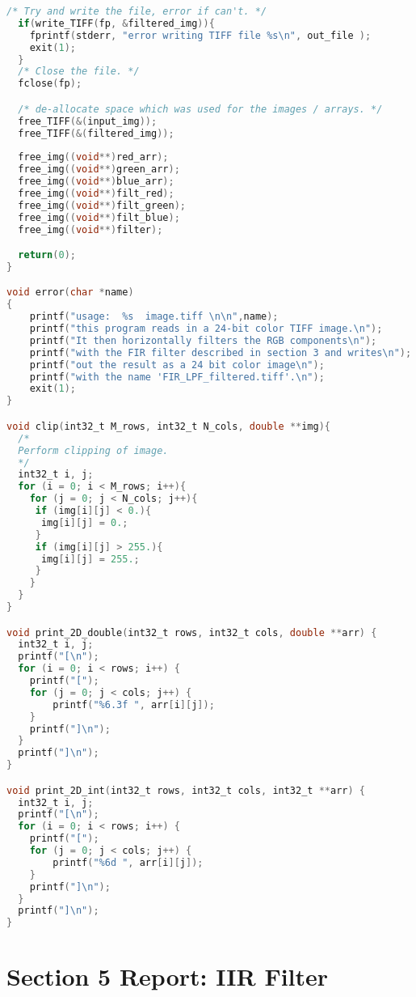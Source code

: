 \documentclass{article}
\begin{document}
\begin{lstlisting}[language=C, caption=filter\_image\_section4.c, label={lst:sec4}]
  /* Try and write the file, error if can't. */
  if(write_TIFF(fp, &filtered_img)){
    fprintf(stderr, "error writing TIFF file %s\n", out_file );
    exit(1);
  }
  /* Close the file. */
  fclose(fp);

  /* de-allocate space which was used for the images / arrays. */
  free_TIFF(&(input_img));
  free_TIFF(&(filtered_img));
  
  free_img((void**)red_arr);
  free_img((void**)green_arr);  
  free_img((void**)blue_arr);
  free_img((void**)filt_red);
  free_img((void**)filt_green);
  free_img((void**)filt_blue);
  free_img((void**)filter);

  return(0);
}

void error(char *name)
{
    printf("usage:  %s  image.tiff \n\n",name);
    printf("this program reads in a 24-bit color TIFF image.\n");
    printf("It then horizontally filters the RGB components\n");
    printf("with the FIR filter described in section 3 and writes\n");
    printf("out the result as a 24 bit color image\n");
    printf("with the name 'FIR_LPF_filtered.tiff'.\n");
    exit(1);
}

void clip(int32_t M_rows, int32_t N_cols, double **img){
  /*
  Perform clipping of image.
  */
  int32_t i, j;
  for (i = 0; i < M_rows; i++){
    for (j = 0; j < N_cols; j++){
     if (img[i][j] < 0.){
      img[i][j] = 0.;
     }
     if (img[i][j] > 255.){
      img[i][j] = 255.;
     }
    } 
  }
}

void print_2D_double(int32_t rows, int32_t cols, double **arr) {
  int32_t i, j;
  printf("[\n");
  for (i = 0; i < rows; i++) {
    printf("[");
    for (j = 0; j < cols; j++) {
        printf("%6.3f ", arr[i][j]);
    }
    printf("]\n");
  }
  printf("]\n");
}

void print_2D_int(int32_t rows, int32_t cols, int32_t **arr) {
  int32_t i, j;
  printf("[\n");
  for (i = 0; i < rows; i++) {
    printf("[");
    for (j = 0; j < cols; j++) {
        printf("%6d ", arr[i][j]);
    }
    printf("]\n");
  }
  printf("]\n");
}
\end{lstlisting}


\newpage
\section{Section 5 Report: IIR Filter}
\end{document}
